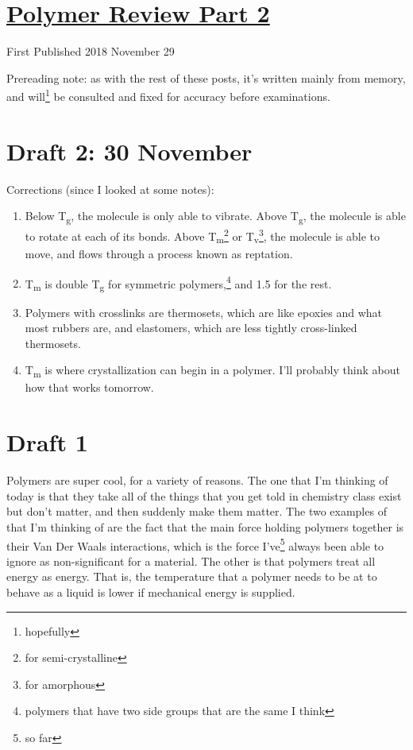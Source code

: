 \documentclass[12pt]{article}[titlepage]
\newcommand{\1}{\={a}}
\newcommand{\2}{\={e}}
\newcommand{\3}{\={\i}}
\newcommand{\4}{\=o}
\newcommand{\5}{\=u}
\newcommand{\6}{\={A}}
\newcommand{\sub}[1]{\textsubscript{#1}}
\renewcommand{\,}{\textsuperscript{,}}
\begin{document}
\doublespacing
\section{\href{polymer-2.html}{Polymer Review Part 2}}
First Published 2018 November 29

Prereading note: as with the rest of these posts, it's written mainly from memory, and will\footnote{hopefully} be consulted and fixed for accuracy before examinations.

\section{Draft 2: 30 November}
Corrections (since I looked at some notes):
\begin{enumerate}
\item Below T\sub{g}, the molecule is only able to vibrate.
Above T\sub{g}, the molecule is able to rotate at each of its bonds.
Above T\sub{m}\footnote{for semi-crystalline} or T\sub{v}\footnote{for amorphous}, the molecule is able to move, and flows through a process known as reptation.
\item T\sub{m} is double T\sub{g} for symmetric polymers,\footnote{polymers that have two side groups that are the same I think} and 1.5 for the rest.
\item Polymers with crosslinks are thermosets, which are like epoxies and what most rubbers are, and elastomers, which are less tightly cross-linked thermosets.
\item T\sub{m} is where crystallization can begin in a polymer.
I'll probably think about how that works tomorrow.
\end{enumerate} 

\section{Draft 1}
Polymers are super cool, for a variety of reasons.
The one that I'm thinking of today is that they take all of the things that you get told in chemistry class exist but don't matter, and then suddenly make them matter.
The two examples of that I'm thinking of are the fact that the main force holding polymers together is their Van Der Waals interactions, which is the force I've\footnote{so far} always been able to ignore as non-significant for a material.
The other is that polymers treat all energy as energy.
That is, the temperature that a polymer needs to be at to behave as a liquid is lower if mechanical energy is supplied.
\end{document}
